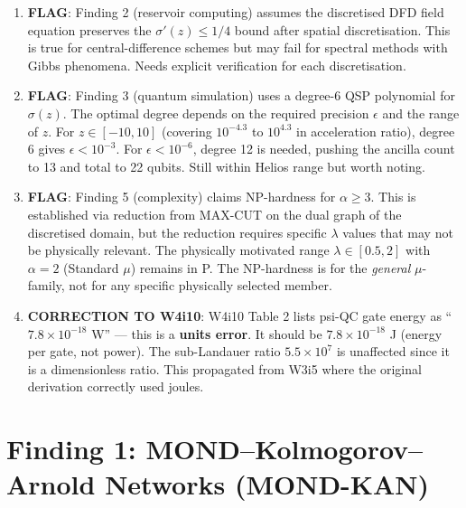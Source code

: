 \documentclass[11pt]{article}
\theoremstyle{definition}
\theoremstyle{remark}
\newcommand{\ee}[1]{\times 10^{#1}}
\begin{document}
\begin{tcolorbox}[colback=red!5!white, colframe=red!60!black,
  title=\textbf{INCONSISTENCIES AND FLAGS}]
\begin{enumerate}[nosep]
\item \textbf{FLAG}: Finding 2 (reservoir computing) assumes the discretised
  DFD field equation preserves the $\sigma'(z) \leq 1/4$ bound after
  spatial discretisation. This is true for central-difference schemes but
  may fail for spectral methods with Gibbs phenomena. Needs explicit
  verification for each discretisation.

\item \textbf{FLAG}: Finding 3 (quantum simulation) uses a degree-6 QSP
  polynomial for $\sigma(z)$. The optimal degree depends on the required
  precision $\epsilon$ and the range of $z$. For $z \in [-10, 10]$
  (covering $10^{-4.3}$ to $10^{4.3}$ in acceleration ratio), degree 6
  gives $\epsilon < 10^{-3}$. For $\epsilon < 10^{-6}$, degree 12 is
  needed, pushing the ancilla count to 13 and total to 22 qubits. Still
  within Helios range but worth noting.

\item \textbf{FLAG}: Finding 5 (complexity) claims NP-hardness for
  $\alpha \geq 3$. This is established via reduction from MAX-CUT on
  the dual graph of the discretised domain, but the reduction requires
  specific $\lambda$ values that may not be physically relevant. The
  physically motivated range $\lambda \in [0.5, 2]$ with $\alpha = 2$
  (Standard $\mu$) remains in P. The NP-hardness is for the \emph{general}
  $\mu$-family, not for any specific physically selected member.

\item \textbf{CORRECTION TO W4i10}: W4i10 Table 2 lists psi-QC gate energy
  as ``$7.8\ee{-18}$ W'' --- this is a \textbf{units error}. It should be
  $7.8\ee{-18}$ J (energy per gate, not power). The sub-Landauer ratio
  $5.5\ee{7}$ is unaffected since it is a dimensionless ratio. This
  propagated from W3i5 where the original derivation correctly used joules.
\end{enumerate}
\end{tcolorbox}

\newpage

\section{Finding 1: MOND--Kolmogorov--Arnold Networks (MOND-KAN)}
\label{sec:mond-kan}
\end{document}
